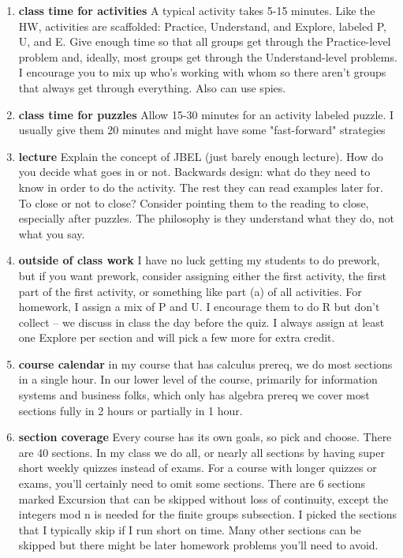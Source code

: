 \begin{enumerate}
    \item \textbf{class time for activities} A typical activity takes 5-15 minutes. Like the HW, activities are scaffolded: Practice, Understand, and Explore, labeled P, U, and E. Give enough time so that all groups get through the Practice-level problem and, ideally, most groups get through the Understand-level problems. I encourage you to mix up who's working with whom so there aren't groups that always get through everything.  Also can use spies.
    \item \textbf{class time for puzzles}  Allow 15-30 minutes for an activity labeled puzzle. I usually give them 20 minutes and might have some "fast-forward" strategies
    \item \textbf{lecture}  Explain the concept of JBEL (just barely enough lecture).  How do you decide what goes in or not. Backwards design:  what do they need to know in order to do the activity.  The rest they can read examples later for.  To close or not to close?  Consider pointing them to the reading to close, especially after puzzles.  The philosophy is they understand what they do, not what you say.
    \item \textbf{outside of class work}  I have no luck getting my students to do prework, but if you want prework, consider assigning either the first activity, the first part of the first activity, or something like part (a) of all activities.  For homework, I assign a mix of P and U.  I encourage them to do R but don't collect -- we discuss in class the day before the quiz.  I always assign at least one Explore per section and will pick a few more for extra credit.
    \item \textbf{course calendar} in my course that has calculus prereq, we do most sections in a single hour. In our lower level of the course, primarily for information systems and business folks, which only has algebra prereq we cover most sections fully in 2 hours or partially in 1 hour.  
   \item \textbf{section coverage}  Every course has its own goals, so pick and choose. There are 40 sections.  In my class we do all, or nearly all sections by having super short weekly quizzes instead of exams.  For a course with longer quizzes or exams, you'll certainly need to omit some sections.  There are 6 sections marked Excursion that can be skipped without loss of continuity, except the integers mod n is needed for the finite groups subsection. I picked the sections that I typically skip if I run short on time.  Many other sections can be skipped but there might be later homework problems you'll need to avoid. 


\end{enumerate}
